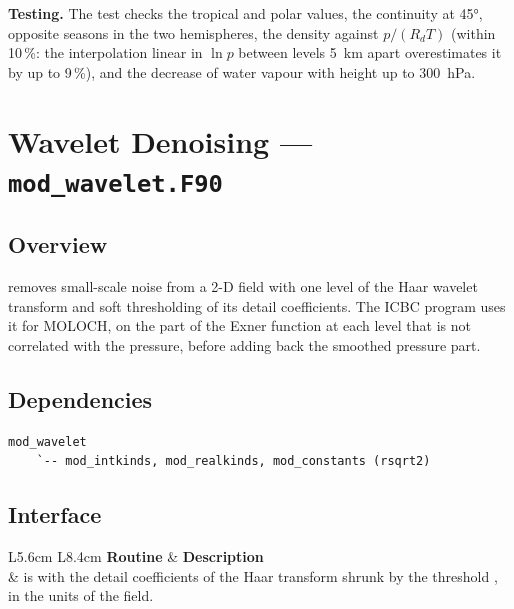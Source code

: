 \textbf{Testing.} The test checks the tropical and polar values, the
continuity at 45°, opposite seasons in the two hemispheres, the density
against $p/(R_dT)$ (within 10\,\%: the interpolation linear in $\ln p$
between levels 5~km apart overestimates it by up to 9\,\%), and the
decrease of water vapour with height up to 300~hPa.

\section{Wavelet Denoising --- \texttt{mod\_wavelet.F90}}
\label{sec:wavelet}

\subsection{Overview}

 removes small-scale noise from a 2-D field with one
level of the Haar wavelet transform and soft thresholding of its detail
coefficients. The ICBC program uses it for MOLOCH, on the part of the Exner
function at each level that is not correlated with the pressure, before
adding back the smoothed pressure part.

\subsection{Dependencies}

\begin{lstlisting}
mod_wavelet
    `-- mod_intkinds, mod_realkinds, mod_constants (rsqrt2)
\end{lstlisting}

\subsection{Interface}

\begin{longtable}{L{5.6cm} L{8.4cm}}
  \toprule
  \textbf{Routine} & \textbf{Description} \\
  \midrule
  \endhead
  \bottomrule
  \endfoot
   &
     is  with the detail coefficients of the Haar
    transform shrunk by the threshold , in the units of the
    field. \\
\end{longtable}

